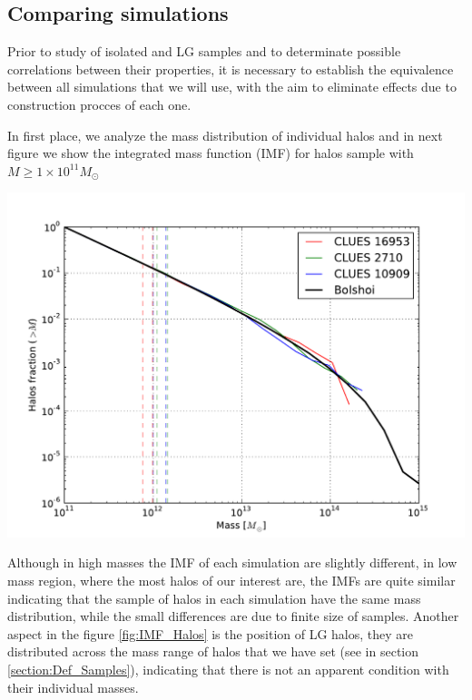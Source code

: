\documentclass[usenatbib]{mn2e}
\begin{document}
\subsection{Comparing simulations}
\label{subsec:comparison_simulations}

Prior to study of isolated and LG samples and to determinate possible correlations between their properties,
it is necessary to establish the equivalence between all simulations that we will use, with the aim to 
eliminate effects due to construction procces of each one.

In first place, we analyze the mass distribution of individual halos and in next figure we show the 
integrated mass function (IMF) for halos sample with $M \geq 1\times 10^{11} M_{\odot}$

\begin{flushleft}
\begin{center}
\includegraphics[keepaspectratio=true,width=0.35\textheight]{./figures/Halos_IMF.pdf}
\label{fig:IMF_Halos}
\vspace{0.1 cm}
\end{center}
\end{flushleft}

Although in high masses the IMF of each simulation are slightly different, in low mass region, where
the most halos of our interest are, the IMFs are quite similar indicating that the sample of halos in
each simulation have the same mass distribution, while the small differences are due to finite 
size of samples. Another aspect in the figure \ref{fig:IMF_Halos} is the position of LG halos, they 
are distributed across the mass range of halos that we have set (see in section \ref{section:Def_Samples}),
indicating that there is not an apparent condition with their individual masses.
\end{document}
